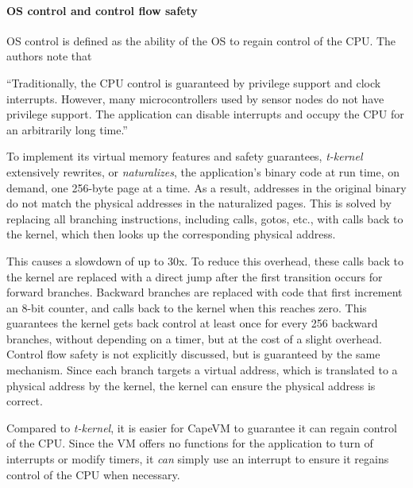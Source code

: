 \paragraph{OS control and control flow safety}
OS control is defined as the ability of the OS to regain control of the CPU. The authors note that

\begin{displayquote}“Traditionally, the CPU control is guaranteed by privilege support and clock interrupts. However, many microcontrollers used by sensor nodes do not have privilege support. The application can disable interrupts and occupy the CPU for an arbitrarily long time.”\end{displayquote}

To implement its virtual memory features and safety guarantees, \emph{t-kernel} extensively rewrites, or \emph{naturalizes}, the application's binary code at run time, on demand, one 256-byte page at a time. As a result, addresses in the original binary do not match the physical addresses in the naturalized pages. This is solved by replacing all branching instructions, including calls, gotos, etc., with calls back to the kernel, which then looks up the corresponding physical address.

This causes a slowdown of up to 30x. To reduce this overhead, these calls back to the kernel are replaced with a direct jump after the first transition occurs for forward branches. Backward branches are replaced with code that first increment an 8-bit counter, and calls back to the kernel when this reaches zero. This guarantees the kernel gets back control at least once for every 256 backward branches, without depending on a timer, but at the cost of a slight overhead. Control flow safety is not explicitly discussed, but is guaranteed by the same mechanism. Since each branch targets a virtual address, which is translated to a physical address by the kernel, the kernel can ensure the physical address is correct.

Compared to \emph{t-kernel}, it is easier for CapeVM to guarantee it can regain control of the CPU. Since the VM offers no functions for the application to turn of interrupts or modify timers, it \emph{can} simply use an interrupt to ensure it regains control of the CPU when necessary.


